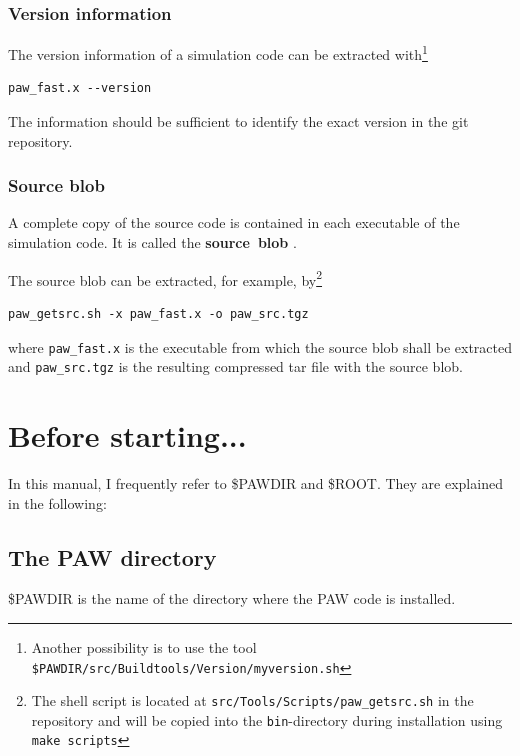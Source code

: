 \documentclass[final,12pt]{article}
\begin{document}
\subsubsection{Version information}
The version information of a simulation code can be extracted
with\footnote{Another possibility is to use the tool
\texttt{\${PAWDIR}/src/Buildtools/Version/myversion.sh}}
\begin{verbatim}
paw_fast.x --version
\end{verbatim}
The information should be sufficient to identify the exact version in
the git repository.


\subsubsection{Source blob}
A complete copy of the source code is contained in each executable of
the simulation code. It is called the \textbf{source~blob}
.

The source blob can be extracted, for example, by\footnote{The shell
script is located at \texttt{src/Tools/Scripts/paw\_getsrc.sh} in the
repository and will be copied into the \texttt{bin}-directory during
installation using \texttt{make scripts}}
\begin{verbatim}
paw_getsrc.sh -x paw_fast.x -o paw_src.tgz
\end{verbatim}
where \verb|paw_fast.x| is the executable from which the source blob
shall be extracted and \verb|paw_src.tgz| is the resulting compressed
tar file with the source blob.

\section{Before starting...}
In this manual, I frequently refer to \$PAWDIR and \$ROOT. They are
explained in the following:

\subsection{The PAW directory}
\$PAWDIR is the name of the directory where the PAW code is
installed. 
\end{document}
